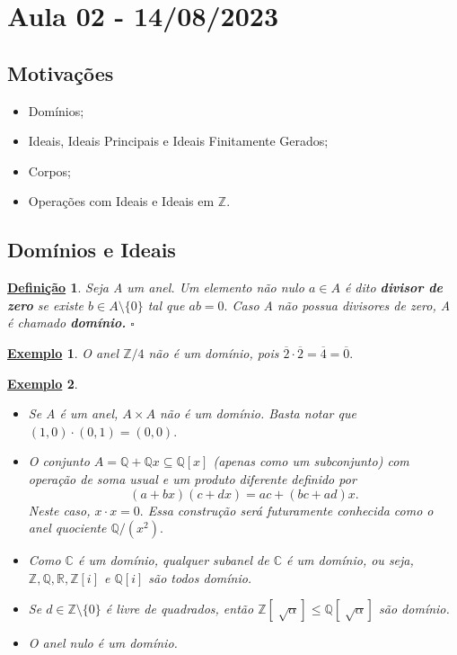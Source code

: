 \documentclass{article}
\newtheorem*{def*}{\underline{Defini\c c\~ao}}
\newtheorem{example}{\underline{Exemplo}}
\begin{document}
\section{Aula 02 - 14/08/2023}
\subsection{Motivações}
\begin{itemize}
  \item Domínios;
  \item Ideais, Ideais Principais e Ideais Finitamente Gerados;
  \item Corpos;
  \item Operações com Ideais e Ideais em \(\mathbb{Z}\).
\end{itemize}
\subsection{Domínios e Ideais}
\begin{def*}
  Seja A um anel. Um elemento não nulo \(a\in A\) é dito \textbf{divisor de zero} se existe \(b\in A\setminus{\{0\}}\) tal que
  \(ab = 0.\) Caso A não possua divisores de zero, A é chamado \textbf{domínio.} \(\square\)
\end{def*}
\begin{example}
  O anel \(\mathbb{Z}/4\) não é um domínio, pois \(\overline{2}\cdot \overline{2} = \overline{4} = \overline{0}.\)
\end{example}
\begin{example}
  \begin{itemize}
    \item[1)] Se A é um anel, \(A\times A\) não é um domínio. Basta notar que \((1, 0)\cdot (0, 1) = (0, 0).\)
    \item[2)] O conjunto \(A = \mathbb{Q} + \mathbb{Q}x \subseteq{\mathbb{Q}[x]}\) (apenas como um subconjunto) com operação de soma usual e um
      produto diferente definido por 
      \[
        (a+bx)(c+dx) = ac + (bc+ad)x.
      \]
      Neste caso, \(x \cdot x = 0.\) Essa construção será futuramente conhecida como o anel quociente \(\mathbb{Q}/(x^{2}).\)
    \item[3)] Como \(\mathbb{C}\) é um domínio, qualquer subanel de \(\mathbb{C}\) é um domínio, ou seja, \(\mathbb{Z}, \mathbb{Q}, \mathbb{R}, \mathbb{Z}[i]\) e \(\mathbb{Q}[i]\)
  são todos domínio.
  \item[4)] Se \(d\in \mathbb{Z}\setminus{\{0\}}\) é livre de quadrados, então \(\mathbb{Z}[\sqrt[]{\alpha }]\leq \mathbb{Q}[\sqrt[]{\alpha }] \) são domínio.
  \item[5)] O anel nulo é um domínio.
  \end{itemize}
\end{example}
\end{document}
